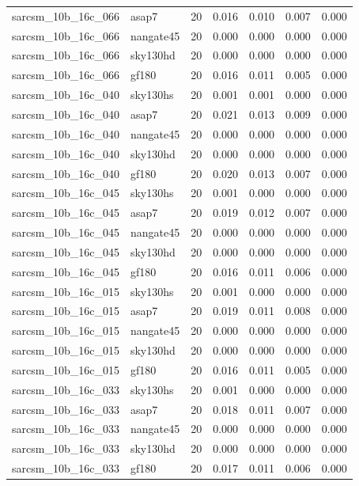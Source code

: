 \begin{tabular}{llrrrrr}
sarcsm\_10b\_16c\_066 & asap7 & 20 & 0.016 & 0.010 & 0.007 & 0.000 \\
sarcsm\_10b\_16c\_066 & nangate45 & 20 & 0.000 & 0.000 & 0.000 & 0.000 \\
sarcsm\_10b\_16c\_066 & sky130hd & 20 & 0.000 & 0.000 & 0.000 & 0.000 \\
sarcsm\_10b\_16c\_066 & gf180 & 20 & 0.016 & 0.011 & 0.005 & 0.000 \\
sarcsm\_10b\_16c\_040 & sky130hs & 20 & 0.001 & 0.001 & 0.000 & 0.000 \\
sarcsm\_10b\_16c\_040 & asap7 & 20 & 0.021 & 0.013 & 0.009 & 0.000 \\
sarcsm\_10b\_16c\_040 & nangate45 & 20 & 0.000 & 0.000 & 0.000 & 0.000 \\
sarcsm\_10b\_16c\_040 & sky130hd & 20 & 0.000 & 0.000 & 0.000 & 0.000 \\
sarcsm\_10b\_16c\_040 & gf180 & 20 & 0.020 & 0.013 & 0.007 & 0.000 \\
sarcsm\_10b\_16c\_045 & sky130hs & 20 & 0.001 & 0.000 & 0.000 & 0.000 \\
sarcsm\_10b\_16c\_045 & asap7 & 20 & 0.019 & 0.012 & 0.007 & 0.000 \\
sarcsm\_10b\_16c\_045 & nangate45 & 20 & 0.000 & 0.000 & 0.000 & 0.000 \\
sarcsm\_10b\_16c\_045 & sky130hd & 20 & 0.000 & 0.000 & 0.000 & 0.000 \\
sarcsm\_10b\_16c\_045 & gf180 & 20 & 0.016 & 0.011 & 0.006 & 0.000 \\
sarcsm\_10b\_16c\_015 & sky130hs & 20 & 0.001 & 0.000 & 0.000 & 0.000 \\
sarcsm\_10b\_16c\_015 & asap7 & 20 & 0.019 & 0.011 & 0.008 & 0.000 \\
sarcsm\_10b\_16c\_015 & nangate45 & 20 & 0.000 & 0.000 & 0.000 & 0.000 \\
sarcsm\_10b\_16c\_015 & sky130hd & 20 & 0.000 & 0.000 & 0.000 & 0.000 \\
sarcsm\_10b\_16c\_015 & gf180 & 20 & 0.016 & 0.011 & 0.005 & 0.000 \\
sarcsm\_10b\_16c\_033 & sky130hs & 20 & 0.001 & 0.000 & 0.000 & 0.000 \\
sarcsm\_10b\_16c\_033 & asap7 & 20 & 0.018 & 0.011 & 0.007 & 0.000 \\
sarcsm\_10b\_16c\_033 & nangate45 & 20 & 0.000 & 0.000 & 0.000 & 0.000 \\
sarcsm\_10b\_16c\_033 & sky130hd & 20 & 0.000 & 0.000 & 0.000 & 0.000 \\
sarcsm\_10b\_16c\_033 & gf180 & 20 & 0.017 & 0.011 & 0.006 & 0.000 \\

\end{tabular}
